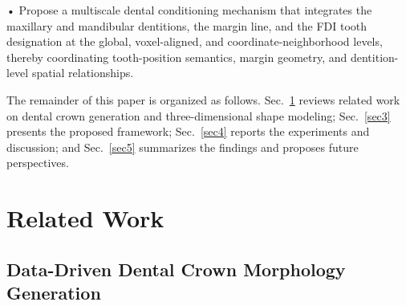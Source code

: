 \documentclass[preprint,review,12pt]{elsarticle}
\begin{document}
\hspace{1em}• Propose a multiscale dental conditioning mechanism that integrates the maxillary and mandibular dentitions, the margin line, and the FDI tooth designation at the global, voxel-aligned, and coordinate-neighborhood levels, thereby coordinating tooth-position semantics, margin geometry, and dentition-level spatial relationships.


\hspace{2em}The remainder of this paper is organized as follows. Sec.~\ref{sec2} reviews related work on dental crown generation and three-dimensional shape modeling; Sec.~\ref{sec3} presents the proposed framework; Sec.~\ref{sec4} reports the experiments and discussion; and Sec.~\ref{sec5} summarizes the findings and proposes future perspectives.


\section{Related Work}\label{sec2}


\subsection{Data-Driven Dental Crown Morphology Generation}\label{subsec2_1}
\end{document}
